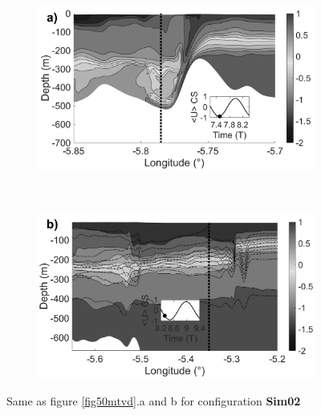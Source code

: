 \documentclass[a4paper,12pt]{article}
\begin{document}
\begin{figure}[!t]
  
  \begin{subfigure}{0.5\linewidth}
  \includegraphics[width=\textwidth]{RW_J3_21_hydro.png}
  \end{subfigure}
  ~
  \begin{subfigure}{0.5\linewidth}
  \includegraphics[width=\textwidth]{RW_83T_hydro.png}
  \end{subfigure}
 
  \caption{Same as figure \ref{fig50mtvd}.a %
  and b for configuration \textbf{Sim02}}
  \label{fig220HNH}
\end{figure}
\end{document}
